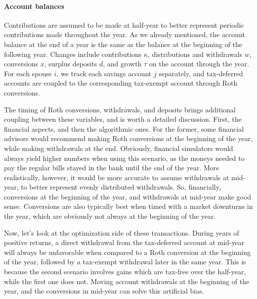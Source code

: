 \documentclass{report}[fleqn,12pt]
\begin{document}
\paragraph*{Account balances}
	Contributions are assumed to be made at half-year to better represent periodic contributions
	made throughout the year. As we already mentioned,
	the account balance at the end of a year is the same as the balance
	at the beginning of the following year.
	Changes include contributions $\kappa$, distributions and withdrawals $w$,
	conversions $x$, surplus deposits $d$, and growth $\tau$ on the account through the year.
	For each spouse $i$, we track each savings account $j$ separately, and tax-deferred accounts
	are coupled to the corresponding tax-exempt account through Roth conversions.

	The timing of Roth conversions, withdrawals, and deposits brings
	additional coupling between these variables, and is worth a detailed discussion.
	First, the financial aspects, and then the algorithmic ones.
	For the former, some financial advisors would recommend making Roth
	conversions at the beginning of the year, while making withdrawals
	at the end. Obviously, financial simulators would always yield higher numbers
	when using this scenario, as the moneys needed to pay the regular bills 
	stayed in the bank until the end of the year. More realistically,
	however, it would be more accurate to assume withdrawals at mid-year,
	to better represent evenly distributed withdrawals. So, financially,
	conversions at the beginning of the year, and withdrawals at mid-year
	make good sense. Conversions are also typically best when
	timed with a market downturns in the year, which are obviously not always at the
	beginning of the year.

	Now, let's look at the optimization side of these transactions.
	During years of positive returns,
	a direct withdrawal from the tax-deferred account at mid-year will always
	be unfavorable when compared to a Roth conversion
	at the beginning of the year, followed
	by a tax-exempt withdrawal later in the same year.
	This is because the second
	scenario involves gains which are tax-free over the half-year, while
	the first one does not. Moving account withdrawals at the beginning
	of the year, and the conversions in mid-year can solve this artificial bias.
\end{document}
